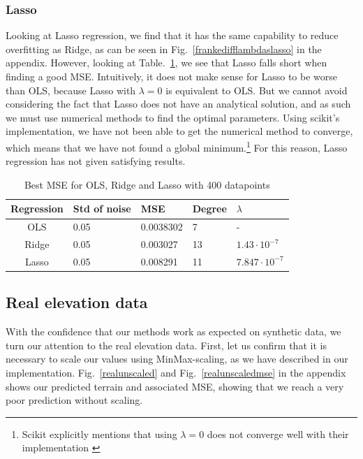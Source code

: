 \documentclass[twocolumn,10pt,cleanfoot]{asme2ej}
\begin{document}
\subsubsection{Lasso}

Looking at Lasso regression, we find that it has the same capability to reduce overfitting as Ridge, as can be seen in Fig.~\ref{frankedifflambdaslasso} in the appendix. However, looking at Table.~\ref{ols_vs_ridge_vs_lasso_table}, we see that Lasso falls short when finding a good MSE. Intuitively, it does not make sense for Lasso to be worse than OLS, because Lasso with $\lambda = 0$ is equivalent to OLS. But we cannot avoid considering the fact that Lasso does not have an analytical solution, and as such we must use numerical methods to find the optimal parameters. Using scikit's implementation, we have not been able to get the numerical method to converge, which means that we have not found a global minimum.\footnote{Scikit explicitly mentions that using $\lambda = 0$ does not converge well with their implementation \cite{lasso}} For this reason, Lasso regression has not given satisfying results.


\begin{table}[t]
\caption{Best MSE for OLS, Ridge and Lasso with 400 datapoints}
\begin{center}
\label{ols_vs_ridge_vs_lasso_table}
\begin{tabular}{c | l l l l}
Regression & Std of noise & MSE & Degree & $\lambda$ \\
\hline
OLS & 0.05 & 0.0038302 & 7 & - \\
Ridge & 0.05 & 0.003027 & 13 & $1.43 \cdot 10^{-7}$ \\
Lasso & 0.05 & 0.008291 & 11 & $7.847 \cdot 10^{-7}$ \\
\hline
\end{tabular}
\end{center}
\end{table}


\subsection{Real elevation data}

With the confidence that our methods work as expected on synthetic data, we turn our attention to the real elevation data. First, let us confirm that it is necessary to scale our values using MinMax-scaling, as we have described in our implementation. Fig.~\ref{realunscaled} and Fig.~\ref{realunscaledmse} in the appendix shows our predicted terrain and associated MSE, showing that we reach a very poor prediction without scaling.
\end{document}
